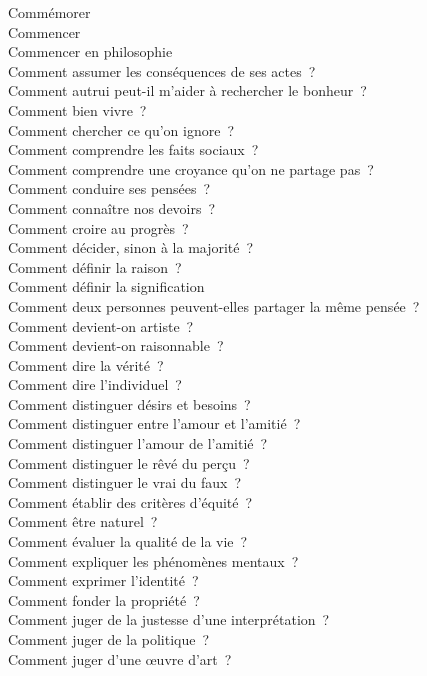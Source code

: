 \documentclass[a4paper,12pt]{article}
\begin{document}
Commémorer \\
Commencer \\
Commencer en philosophie \\
Comment assumer les conséquences de ses actes ? \\
Comment autrui peut-il m'aider à rechercher le bonheur ? \\
Comment bien vivre ? \\
Comment chercher ce qu'on ignore ? \\
Comment comprendre les faits sociaux ? \\
Comment comprendre une croyance qu'on ne partage pas ? \\
Comment conduire ses pensées ? \\
Comment connaître nos devoirs ? \\
Comment croire au progrès ? \\
Comment décider, sinon à la majorité ? \\
Comment définir la raison ? \\
Comment définir la signification \\
Comment deux personnes peuvent-elles partager la même pensée ? \\
Comment devient-on artiste ? \\
Comment devient-on raisonnable ? \\
Comment dire la vérité ? \\
Comment dire l'individuel ? \\
Comment distinguer désirs et besoins ? \\
Comment distinguer entre l'amour et l'amitié ? \\
Comment distinguer l'amour de l'amitié ? \\
Comment distinguer le rêvé du perçu ? \\
Comment distinguer le vrai du faux ? \\
Comment établir des critères d'équité ? \\
Comment être naturel ? \\
Comment évaluer la qualité de la vie ? \\
Comment expliquer les phénomènes mentaux ? \\
Comment exprimer l'identité ? \\
Comment fonder la propriété ? \\
Comment juger de la justesse d'une interprétation ? \\
Comment juger de la politique ? \\
Comment juger d'une œuvre d'art ? \\
\end{document}
